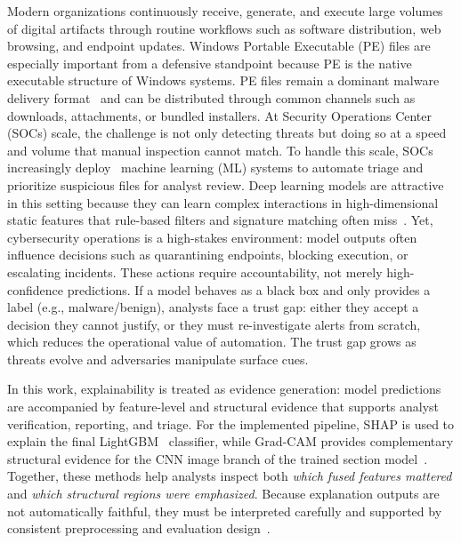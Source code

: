 \documentclass[conference]{IEEEtran}
\begin{document}
Modern organizations continuously receive, generate, and execute large volumes of digital artifacts through routine workflows such as software distribution, web browsing, and endpoint updates.
Windows Portable Executable (PE) files are especially important from a defensive standpoint because PE is the native executable structure of Windows systems.
PE files remain a dominant malware delivery format~\cite{opentext2025} and can be distributed through common channels such as downloads, attachments, or bundled installers.
At Security Operations Center (SOCs) scale, the challenge is not only detecting threats but doing so at a speed and volume that manual inspection cannot match.
To handle this scale, SOCs increasingly deploy~\cite{SDRS2025} machine learning (ML) systems to automate triage and prioritize suspicious files for analyst review.
Deep learning models are attractive in this setting because they can learn complex interactions in high-dimensional static features that rule-based filters and signature matching often miss~\cite{DSR2025ai}.
Yet, cybersecurity operations is a high-stakes environment: model outputs often influence decisions such as quarantining endpoints, blocking execution, or escalating incidents.
These actions require accountability, not merely high-confidence predictions.
If a model behaves as a black box and only provides a label (e.g., malware/benign), analysts face a trust gap: either they accept a decision they cannot justify, or they must re-investigate alerts from scratch, which reduces the operational value of automation.
The trust gap grows as threats evolve and adversaries manipulate surface cues.


In this work, explainability is treated as evidence generation: model predictions are accompanied by feature-level and structural evidence that supports analyst verification, reporting, and triage.
For the implemented pipeline, SHAP is used to explain the final LightGBM~\cite{lightgbm} classifier, while Grad-CAM provides complementary structural evidence for the CNN image branch of the trained section model~\cite{LL2017,SCDVPB2017}.
Together, these methods help analysts inspect both \emph{which fused features mattered} and \emph{which structural regions were emphasized}.
Because explanation outputs are not automatically faithful, they must be interpreted carefully and supported by consistent preprocessing and evaluation design~\cite{JW2019}.
\end{document}
